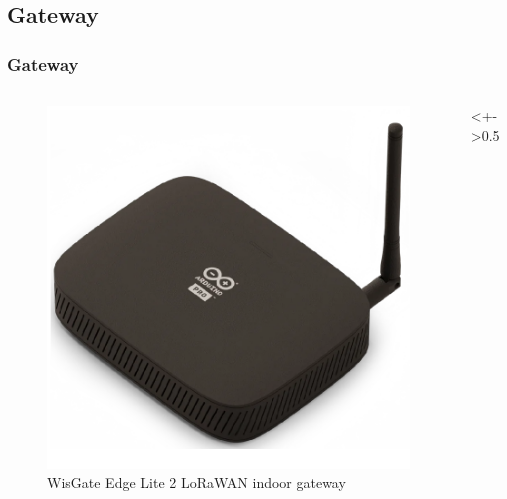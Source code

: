 \documentclass{beamer}
\begin{document}
\subsection{Gateway}
\begin{frame}
    \frametitle{Gateway}
    \begin{columns}[]
        \begin{column}{0.5\textwidth}
            \begin{figure}
                \includegraphics[width=\textwidth]{images/wisgate_indoor.png}
                \caption{WisGate Edge Lite 2 LoRaWAN indoor gateway}
            \end{figure}
        \end{column}
        \begin{column}<+->{0.5\textwidth}
            \begin{figure}

\end{figure}
\end{column}
\end{columns}
\end{frame}
\end{document}
